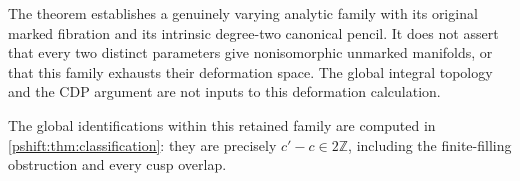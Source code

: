 The theorem establishes a genuinely varying analytic family with its
original marked fibration and its intrinsic degree-two canonical pencil.
It does not assert that every two distinct parameters give nonisomorphic
unmarked manifolds, or that this family exhausts their deformation space.
The global integral topology and the CDP argument are not inputs to this
deformation calculation.


The global identifications within this retained family are computed in
\cref{pshift:thm:classification}: they are precisely $c'-c\in2\mathbb Z$,
including the finite-filling obstruction and every cusp overlap.
